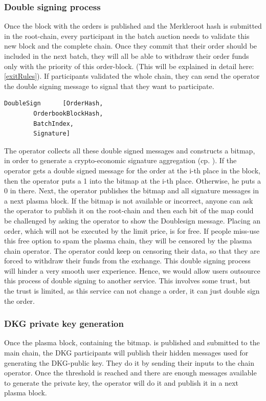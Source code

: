 \documentclass[11pt,parskip=full]{scrartcl}%
\begin{document}
\subsubsection{Double signing process}
Once the block with the orders is published and the Merkleroot hash is submitted in the root-chain, every participant in the batch auction needs to validate this new block and the complete chain. Once they commit that their order should be included in the next batch, they will all be able to withdraw their order funds only with the priority of this order-block. (This will be explained in detail here: \ref{exitRules}).
If participants validated the whole chain, they can send the operator the double signing message to signal that they want to participate.
\begin{lstlisting}
DoubleSign      [OrderHash,
		OrderbookBlockHash,
		BatchIndex,
		Signature]
\end{lstlisting}
The operator collects all these double signed messages and constructs a bitmap, in order to generate a crypto-economic signature aggregation (cp. \cite{sig}). If the operator gets a double signed message for the order at the i-th place in the block, then the operator puts a 1 into the bitmap at the i-th place. Otherwise, he puts a 0 in there. Next, the operator publishes the bitmap and all signature messages in a next plasma block. If the bitmap is not available or incorrect, anyone can ask the operator to publish it on the root-chain and then each bit of the map could be challenged by asking the operator to show the Doublesign message. \newline
Placing an order, which will not be executed by the limit price, is for free. If people miss-use this free option to spam the plasma chain, they will be censored by the plasma chain operator. The operator could keep on censoring their data, so that they are forced to withdraw their funds from the exchange.\newline
This double signing process will hinder a very smooth user experience. Hence, we would allow users outsource this process of double signing to another service. This involves some trust, but the trust is limited, as this service can not change a order, it can just double sign the order. 

\subsubsection{DKG private key generation}
Once the plasma block, containing the bitmap. is published and submitted to the main chain, the DKG participants will publish their hidden messages used for generating the DKG-public key. They do it by sending their inputs to the chain operator. Once the threshold is reached and there are enough messages available to generate the private key, the operator will do it and publish it in a next plasma block.
\end{document}
